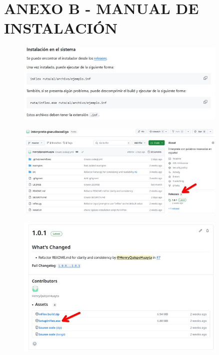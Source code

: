 \section*{ANEXO B - MANUAL DE INSTALACIÓN}
\begin{figure}[!h]
  \includegraphics*[width=0.9\textwidth]{images/apb01.png}
\end{figure}
\begin{figure}[!h]
  \includegraphics*[width=0.9\textwidth]{images/apb02.png}
\end{figure}
\begin{figure}[!h]
  \includegraphics*[width=0.9\textwidth]{images/apb03.png}
\end{figure}
